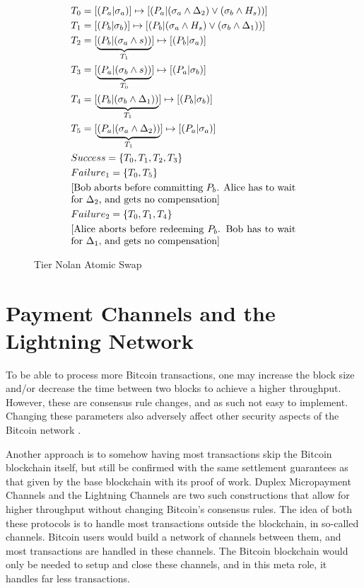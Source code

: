 \begin{figure}[!htb!]
    \centering
    \caption{Tier Nolan Atomic Swap}
    \label{fig:tier_nolan_atomic_swap}
\begin{align*}
    &T_0 = [(P_a|\sigma_a)] \mapsto [(P_a|(\sigma_a \land \Delta_2) \lor (\sigma_b \land H_{s}))] \\
    &T_1 = [(P_b|\sigma_b)] \mapsto [(P_b|(\sigma_a \land H_{s}) \lor (\sigma_b \land \Delta_1))] \\
    &T_2 = [\underbrace{(P_b|(\sigma_a \land s))}_{T_1}] \mapsto [(P_b|\sigma_a)]\\
    &T_3 = [\underbrace{(P_a|(\sigma_b \land s))}_{T_0}] \mapsto [(P_a|\sigma_b)]\\
    &T_4 = [\underbrace{(P_b|(\sigma_b \land \Delta_1))}_{T_1}] \mapsto [(P_b|\sigma_b)] \\
    &T_5 = [\underbrace{(P_a|(\sigma_a \land \Delta_2))}_{T_1}] \mapsto [(P_a|\sigma_a)] \\
    &Success = \{T_0, T_1, T_2, T_3\} \\
    &Failure_1 = \{T_0, T_5\} \\
    &\text{\parbox{8cm}{[Bob aborts before committing $P_b$. Alice has to wait for $\Delta_2$, and gets no compensation]}} \\
    &Failure_2 = \{T_0, T_1, T_4\} \\
    &\text{\parbox{8cm}{[Alice aborts before redeeming $P_b$. Bob has to wait for $\Delta_1$, and gets no compensation]}}
\end{align*}
\end{figure}

\section{Payment Channels and the Lightning Network}
To be able to process more Bitcoin transactions, one may increase the block size and/or decrease the time between two blocks to achieve a higher throughput. However, these are consensus rule changes, and as such not easy to implement. Changing these parameters also adversely affect other security aspects of the Bitcoin network \cite{gervais2016security}. 

Another approach is to somehow having most transactions skip the Bitcoin blockchain itself, but still be confirmed with the same settlement guarantees as that given by the base blockchain with its proof of work. Duplex Micropayment Channels \cite{decker_wattenhofer} and the Lightning Channels \cite{poon_dryja} are two such constructions that allow for higher throughput without changing Bitcoin's consensus rules. The idea of both these protocols is to handle most transactions outside the blockchain, in so-called channels. Bitcoin users would build a network of channels between them, and most transactions are handled in these channels. The Bitcoin blockchain would only be needed to setup and close these channels, and in this meta role, it handles far less transactions. 

